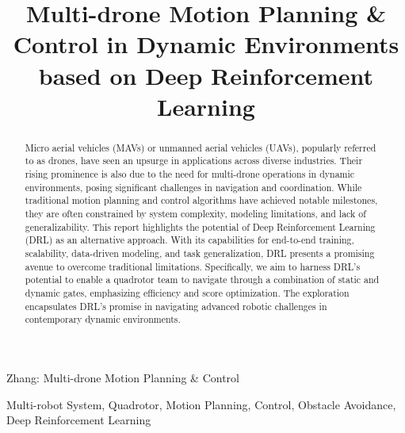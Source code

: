 \documentclass[letterpaper,journal,twoside]{IEEEtran}
\begin{document}
\title{Multi-drone Motion Planning \& Control in Dynamic Environments based on Deep Reinforcement Learning}

\author{
}

\maketitle

\begingroup
\renewcommand\thefootnote{\textsuperscript{1}}
\endgroup

%
{Zhang: Multi-drone Motion Planning \& Control}



\begin{abstract}
  Micro aerial vehicles (MAVs) or unmanned aerial vehicles (UAVs), popularly referred to as drones, have seen an upsurge in applications across diverse industries. Their rising prominence is also due to the need for multi-drone operations in dynamic environments, posing significant challenges in navigation and coordination. While traditional motion planning and control algorithms have achieved notable milestones, they are often constrained by system complexity, modeling limitations, and lack of generalizability. This report highlights the potential of Deep Reinforcement Learning (DRL) as an alternative approach. With its capabilities for end-to-end training, scalability, data-driven modeling, and task generalization, DRL presents a promising avenue to overcome traditional limitations. Specifically, we aim to harness DRL's potential to enable a quadrotor team to navigate through a combination of static and dynamic gates, emphasizing efficiency and score optimization. The exploration encapsulates DRL's promise in navigating advanced robotic challenges in contemporary dynamic environments.
\end{abstract}

\begin{IEEEkeywords}
  Multi-robot System, Quadrotor, Motion Planning, Control, 
  Obstacle Avoidance, Deep Reinforcement Learning
\end{IEEEkeywords}
\end{document}

